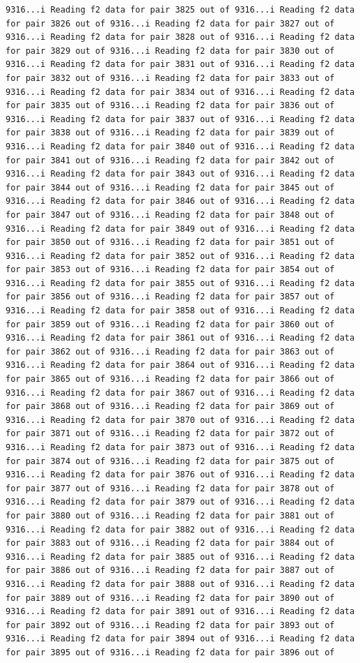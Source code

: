 \documentclass[
]{article}
\begin{document}
\begin{verbatim}
9316...i Reading f2 data for pair 3825 out of 9316...i Reading f2 data for pair 3826 out of 9316...i Reading f2 data for pair 3827 out of 9316...i Reading f2 data for pair 3828 out of 9316...i Reading f2 data for pair 3829 out of 9316...i Reading f2 data for pair 3830 out of 9316...i Reading f2 data for pair 3831 out of 9316...i Reading f2 data for pair 3832 out of 9316...i Reading f2 data for pair 3833 out of 9316...i Reading f2 data for pair 3834 out of 9316...i Reading f2 data for pair 3835 out of 9316...i Reading f2 data for pair 3836 out of 9316...i Reading f2 data for pair 3837 out of 9316...i Reading f2 data for pair 3838 out of 9316...i Reading f2 data for pair 3839 out of 9316...i Reading f2 data for pair 3840 out of 9316...i Reading f2 data for pair 3841 out of 9316...i Reading f2 data for pair 3842 out of 9316...i Reading f2 data for pair 3843 out of 9316...i Reading f2 data for pair 3844 out of 9316...i Reading f2 data for pair 3845 out of 9316...i Reading f2 data for pair 3846 out of 9316...i Reading f2 data for pair 3847 out of 9316...i Reading f2 data for pair 3848 out of 9316...i Reading f2 data for pair 3849 out of 9316...i Reading f2 data for pair 3850 out of 9316...i Reading f2 data for pair 3851 out of 9316...i Reading f2 data for pair 3852 out of 9316...i Reading f2 data for pair 3853 out of 9316...i Reading f2 data for pair 3854 out of 9316...i Reading f2 data for pair 3855 out of 9316...i Reading f2 data for pair 3856 out of 9316...i Reading f2 data for pair 3857 out of 9316...i Reading f2 data for pair 3858 out of 9316...i Reading f2 data for pair 3859 out of 9316...i Reading f2 data for pair 3860 out of 9316...i Reading f2 data for pair 3861 out of 9316...i Reading f2 data for pair 3862 out of 9316...i Reading f2 data for pair 3863 out of 9316...i Reading f2 data for pair 3864 out of 9316...i Reading f2 data for pair 3865 out of 9316...i Reading f2 data for pair 3866 out of 9316...i Reading f2 data for pair 3867 out of 9316...i Reading f2 data for pair 3868 out of 9316...i Reading f2 data for pair 3869 out of 9316...i Reading f2 data for pair 3870 out of 9316...i Reading f2 data for pair 3871 out of 9316...i Reading f2 data for pair 3872 out of 9316...i Reading f2 data for pair 3873 out of 9316...i Reading f2 data for pair 3874 out of 9316...i Reading f2 data for pair 3875 out of 9316...i Reading f2 data for pair 3876 out of 9316...i Reading f2 data for pair 3877 out of 9316...i Reading f2 data for pair 3878 out of 9316...i Reading f2 data for pair 3879 out of 9316...i Reading f2 data for pair 3880 out of 9316...i Reading f2 data for pair 3881 out of 9316...i Reading f2 data for pair 3882 out of 9316...i Reading f2 data for pair 3883 out of 9316...i Reading f2 data for pair 3884 out of 9316...i Reading f2 data for pair 3885 out of 9316...i Reading f2 data for pair 3886 out of 9316...i Reading f2 data for pair 3887 out of 9316...i Reading f2 data for pair 3888 out of 9316...i Reading f2 data for pair 3889 out of 9316...i Reading f2 data for pair 3890 out of 9316...i Reading f2 data for pair 3891 out of 9316...i Reading f2 data for pair 3892 out of 9316...i Reading f2 data for pair 3893 out of 9316...i Reading f2 data for pair 3894 out of 9316...i Reading f2 data for pair 3895 out of 9316...i Reading f2 data for pair 3896 out of 
\end{verbatim}
\end{document}
